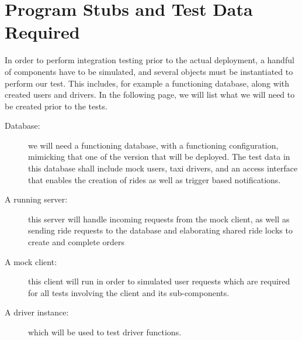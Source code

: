 \section{Program Stubs and Test Data Required}

In order to perform integration testing prior to the actual deployment, a handful of components have to be simulated, and several objects must be instantiated to perform our test.
This includes, for example a functioning database, along with created users and drivers. In the following page, we will list what we will need to be created prior to the tests.

\begin{description}

	\item[Database:] we will need a functioning database, with a functioning configuration, mimicking that one of the version that will be deployed. The test data in this database shall include
	mock users, taxi drivers, and an access interface that enables the creation of rides as well as trigger based notifications.
	\item[A running server:] this server will handle incoming requests from the mock client, as well as sending ride requests to the database and elaborating shared ride locks to create and
	complete orders
	\item[A mock client:] this client will run in order to simulated user requests which are required for all tests involving the client and its sub-components. 
	\item[A driver instance:] which will be used to test driver functions.

\end{description}